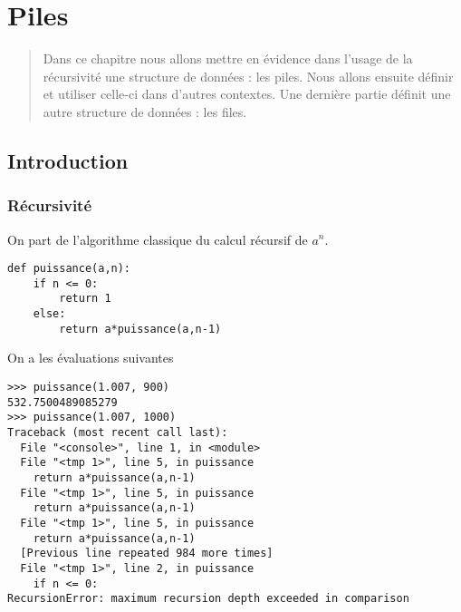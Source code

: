 \chapter{Piles}
\begin{abstract}
    Dans ce chapitre nous allons mettre en évidence dans l'usage de la récursivité une structure de données : les piles. Nous allons ensuite définir et utiliser celle-ci dans d'autres contextes. Une dernière partie définit une autre structure de données : les files.
\end{abstract}
\section{Introduction}
\subsection{Récursivité}
On part de l'algorithme classique du calcul récursif de $a^n$.
\begin{lstlisting}
def puissance(a,n):
    if n <= 0:
        return 1
    else:
        return a*puissance(a,n-1)
\end{lstlisting}

On a les évaluations suivantes
\begin{lstlisting}
>>> puissance(1.007, 900)
532.7500489085279
>>> puissance(1.007, 1000)
Traceback (most recent call last):
  File "<console>", line 1, in <module>
  File "<tmp 1>", line 5, in puissance
    return a*puissance(a,n-1)
  File "<tmp 1>", line 5, in puissance
    return a*puissance(a,n-1)
  File "<tmp 1>", line 5, in puissance
    return a*puissance(a,n-1)
  [Previous line repeated 984 more times]
  File "<tmp 1>", line 2, in puissance
    if n <= 0:
RecursionError: maximum recursion depth exceeded in comparison
\end{lstlisting}

